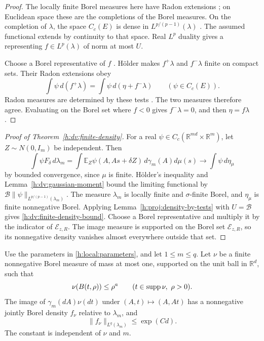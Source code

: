 \begin{proof}
The locally finite Borel measures here have Radon extensions
\cite[Corollary~2.11]{StanfordRadonMeasures}; on Euclidean space
these are the completions of the Borel measures. On the completion of
\(\lambda\), the space \(C_c(E)\) is dense in
\(L^{p/(p-1)}(\lambda)\)
\cite[Proposition~416I]{FremlinRadonMeasures}. The assumed functional
extends by continuity to that space. Real \(L^p\) duality
\cite[Theorem~244K]{FremlinFunctionSpaces} gives a representing
\(f\in L^p(\lambda)\) of norm at most \(U\).

Choose a Borel representative of \(f\)
\cite[Section~241B(k)]{FremlinFunctionSpaces}. H\"older makes
\(f^+\lambda\) and \(f^-\lambda\) finite on compact sets. Their
Radon extensions obey
\[
 \int\psi\,d(f^+\lambda)
 =\int\psi\,d(\eta+f^-\lambda)
 \qquad(\psi\in C_c(E)).
\]
Radon measures are determined by these tests
\cite[Proposition~416E(b)]{FremlinRadonMeasures}. The two measures
therefore agree. Evaluating on the Borel set where \(f<0\) gives
\(f^-\lambda=0\), and then \(\eta=f\lambda\).
\end{proof}

\begin{proof}[Proof of Theorem~\ref{h:dv:finite-density}]
For a real \(\psi\in C_c(\mathbb R^{md}\times\mathbb R^m)\), let
\(Z\sim N(0,I_m)\) be independent.  Then
\[
 \int\psi F_\delta\,d\lambda_m
 =\int\mathbb E_Z\psi(A,As+\delta Z)\,
          d\gamma_m(A)d\mu(s)
 \longrightarrow\int\psi\,d\eta_\mu
\]
by bounded convergence, since \(\mu\) is finite.  H\"older's inequality
and Lemma~\ref{h:dv:gaussian-moment} bound the limiting functional by
\(\mathcal B\|\psi\|_{L^{p/(p-1)}(\lambda_m)}\).
The measure \(\lambda_m\) is locally finite and \(\sigma\)-finite
Borel, and \(\eta_\mu\) is finite nonnegative Borel.  Applying
Lemma~\ref{h:proj:density-by-tests} with \(U=\mathcal B\) gives
\eqref{h:dv:finite-density-bound}. Choose a Borel representative
and multiply it by the indicator of \(\mathcal E_{z,R}\).
The image measure is supported on
the Borel set \(\mathcal E_{z,R}\), so its nonnegative density vanishes
almost everywhere outside that set.
\end{proof}

\begin{corollary}\label{h:proj:normalized}
Use the parameters in \eqref{h:local:parameters}, and let
\(1\le m\le q\). Let \(\nu\) be a finite nonnegative Borel measure
of mass at most one, supported on the unit ball in \(\mathbb R^d\),
such that
\begin{equation}\label{h:proj:growth}
 \nu(B(t,\rho))\le\rho^a
 \qquad(t\in\operatorname{supp}\nu,\ \rho>0).
\end{equation}
The image of \(\gamma_m(dA)\nu(dt)\) under
\((A,t)\mapsto(A,At)\) has a nonnegative jointly Borel density
\(f_\nu\) relative to \(\lambda_m\), and
\begin{equation}\label{h:proj:norm}
 \|f_\nu\|_{L^q(\lambda_m)}\le\exp(Cd).
\end{equation}
The constant is independent of \(\nu\) and \(m\).
\end{corollary}

